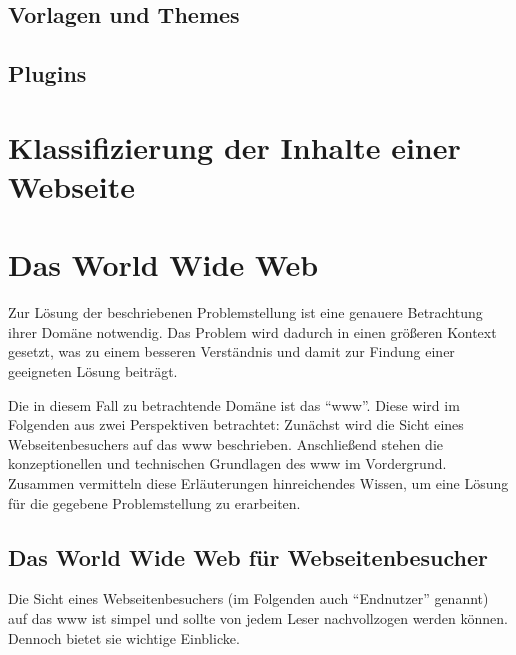         \subsection{Vorlagen und Themes}
        \subsection{Plugins}

    \section{Klassifizierung der Inhalte einer Webseite}

    
    \section{Das World Wide Web}
        \label{section:TheWWW}
        Zur Lösung der beschriebenen Problemstellung ist eine genauere
        Betrachtung ihrer Domäne notwendig.
        Das Problem wird dadurch in einen größeren Kontext gesetzt,
        was zu einem besseren Verständnis und damit zur Findung
        einer geeigneten Lösung beiträgt.

        Die in diesem Fall zu betrachtende Domäne ist das "`\gls{www}"'.
        Diese wird im Folgenden aus zwei Perspektiven betrachtet:
        Zunächst wird die Sicht eines Webseitenbesuchers auf das \gls{www} beschrieben.
        Anschließend stehen die konzeptionellen und technischen Grundlagen
        des \gls{www} im Vordergrund.
        Zusammen vermitteln diese Erläuterungen hinreichendes Wissen,
        um eine Lösung für die gegebene Problemstellung zu erarbeiten.

        \subsection{Das World Wide Web für Webseitenbesucher}
            \label{section:enduserViewOnWWW}
            Die Sicht eines Webseitenbesuchers (im Folgenden auch "`Endnutzer"' genannt)
            auf das \gls{www} ist simpel und sollte von jedem Leser nachvollzogen werden können.
            Dennoch bietet sie wichtige Einblicke.

